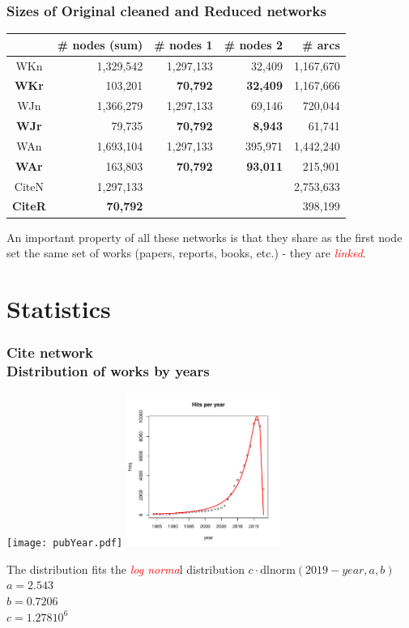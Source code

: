 \documentclass[hyperref={pdfstartview={FitBH -32768},
                         pdfpagemode=FullScreen,
                         plainpages=false,
                         colorlinks=true}
              ]{beamer}
\newcommand{\keyw}[1]{\textcolor{red}{\emph{#1}}}
\begin{document}
\begin{frame}[fragile]
\frametitle{Sizes of Original cleaned and Reduced networks}
\small 

\begin{center}
\begin{tabular}{c|r|r|r|r}
	&\# nodes (sum)	& \# nodes 1	&\# nodes 2	& \# arcs \\ \hline		 
WKn &  	1,329,542	& 1,297,133	& 32,409	& 1,167,670 \\
\textbf{WKr}	& 103,201	& \textbf{70,792}	& \textbf{32,409}	& 1,167,666 \\ \hline	
WJn & 	1,366,279	& 1,297,133	& 69,146	& 720,044    \\ 
\textbf{WJr} 	& 79,735	& \textbf{70,792}	& \textbf{8,943}	& 61,741 \\ \hline	
WAn	& 1,693,104	& 1,297,133	& 395,971	& 1,442,240 \\ 
\textbf{WAr}	& 163,803	& \textbf{70,792}	& \textbf{93,011}	& 215,901 \\ \hline	
CiteN & 1,297,133 & & & 2,753,633\\ 
\textbf{CiteR} & \textbf{70,792} & & & 398,199 \\ \hline
\end{tabular}				
\end{center}		

An important property of all these networks is that they share as the first node set the same set of works (papers, reports, books, etc.) - they are \keyw{linked}.
\end{frame}

\section{Statistics}


\begin{frame}[fragile]
\frametitle{Cite network\label{maxinc}\\ \normalsize Distribution of works by years}

\texttt{[image: pubYear.pdf]}
\includegraphics[width=50mm]{yearshits7.pdf}

\small
The distribution fits the \keyw{log norma}l distribution $c\cdot \mbox{dlnorm}(2019-year,a,b)$\\[3pt]
\footnotesize
$a = 2.543$\\
$b = 0.7206$\\
$c = 1.278 10^6$

\end{frame}
\end{document}
